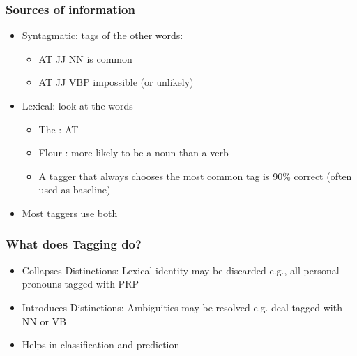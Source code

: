 \begin{frame}[fragile]\frametitle{Sources  of information}
  \begin{itemize}
  \item Syntagmatic: tags of the other words:
    \begin{itemize}
  \item AT JJ NN is common
  \item AT JJ VBP impossible (or unlikely)
    \end{itemize}
  \item Lexical: look at the words
    \begin{itemize}
  \item The : AT
  \item Flour : more likely to be a noun than a verb
  \item A tagger that always chooses the most common tag is 90\% correct (often used as baseline)
    \end{itemize}
  \item Most taggers use both 
  \end{itemize}
\end{frame}

\begin{frame}[fragile]\frametitle{What does Tagging do?}
  \begin{itemize}
  \item Collapses Distinctions: Lexical identity may be discarded e.g., all personal pronouns tagged with PRP
  \item Introduces Distinctions: Ambiguities may be resolved e.g. deal tagged with NN or VB
   \item Helps in classification and prediction
  \end{itemize}
\end{frame}


